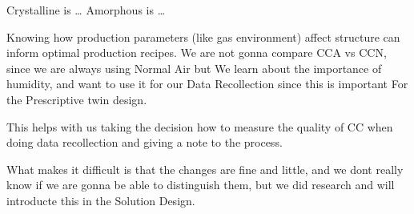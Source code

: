 Crystalline is \dots
Amorphous is \dots


Knowing how production parameters (like gas environment) affect structure can inform optimal production recipes. We are not gonna compare CCA vs CCN, since we are always using Normal Air but
We learn about the importance of humidity, and want to use it for our Data Recollection since this is important For the Prescriptive twin design.

This helps with us taking the decision how to measure the quality of CC when doing data recollection and giving a note to the process.

What makes it difficult is that the changes are fine and little, and we dont really know if we are gonna be able to distinguish them, but we did research and will introducte this in the Solution Design.



